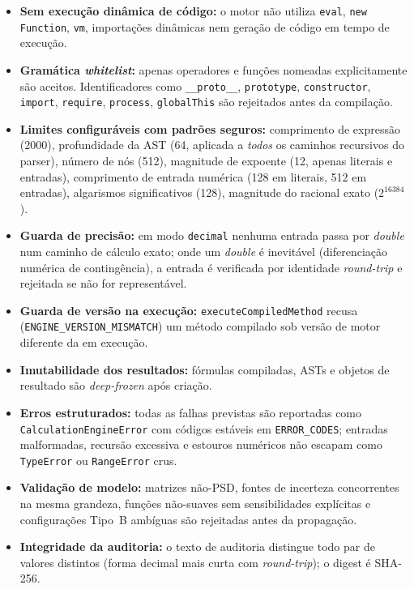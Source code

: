 \documentclass[11pt,a4paper]{article}
\begin{document}
\begin{itemize}
  \item \textbf{Sem execução dinâmica de código:} o motor não utiliza \texttt{eval}, \texttt{new Function}, \texttt{vm}, importações dinâmicas nem geração de código em tempo de execução.
  \item \textbf{Gramática \emph{whitelist}:} apenas operadores e funções nomeadas explicitamente são aceitos. Identificadores como \texttt{\_\_proto\_\_}, \texttt{prototype}, \texttt{constructor}, \texttt{import}, \texttt{require}, \texttt{process}, \texttt{globalThis} são rejeitados antes da compilação.
  \item \textbf{Limites configuráveis com padrões seguros:} comprimento de expressão (2000), profundidade da AST (64, aplicada a \emph{todos} os caminhos recursivos do parser), número de nós (512), magnitude de expoente (12, apenas literais e entradas), comprimento de entrada numérica (128 em literais, 512 em entradas), algarismos significativos (128), magnitude do racional exato (\(2^{16384}\)).
  \item \textbf{Guarda de precisão:} em modo \texttt{decimal} nenhuma entrada passa por \emph{double} num caminho de cálculo exato; onde um \emph{double} é inevitável (diferenciação numérica de contingência), a entrada é verificada por identidade \emph{round-trip} e rejeitada se não for representável.
  \item \textbf{Guarda de versão na execução:} \texttt{executeCompiledMethod} recusa (\texttt{ENGINE\_VERSION\_MISMATCH}) um método compilado sob versão de motor diferente da em execução.
  \item \textbf{Imutabilidade dos resultados:} fórmulas compiladas, ASTs e objetos de resultado são \emph{deep-frozen} após criação.
  \item \textbf{Erros estruturados:} todas as falhas previstas são reportadas como \texttt{CalculationEngineError} com códigos estáveis em \texttt{ERROR\_CODES}; entradas malformadas, recursão excessiva e estouros numéricos não escapam como \texttt{TypeError} ou \texttt{RangeError} crus.
  \item \textbf{Validação de modelo:} matrizes não-PSD, fontes de incerteza concorrentes na mesma grandeza, funções não-suaves sem sensibilidades explícitas e configurações Tipo~B ambíguas são rejeitadas antes da propagação.
  \item \textbf{Integridade da auditoria:} o texto de auditoria distingue todo par de valores distintos (forma decimal mais curta com \emph{round-trip}); o digest é SHA-256.
\end{itemize}
\end{document}
